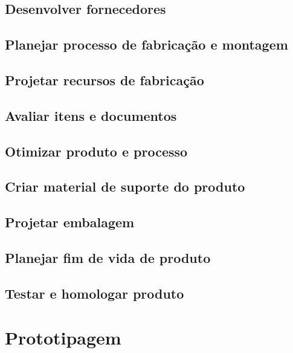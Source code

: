 \documentclass[
	12pt,				%
	openright,			%
	oneside,			%
	a4paper,			%
	english,			%
	french,				%
	spanish,			%
	brazil				%
	]{abntex2}
\begin{document}
\section{Desenvolver fornecedores}

\section{Planejar processo de fabricação e montagem}

\section{Projetar recursos de fabricação}

\section{Avaliar itens e documentos}

\section{Otimizar produto e processo}

\section{Criar material de suporte do produto}

\section{Projetar embalagem}

\section{Planejar fim de vida de produto}

\section{Testar e homologar produto}


\newpage
\chapter{Prototipagem}


\newpage
\postextual






\end{document}

